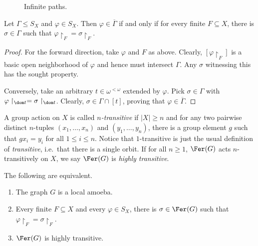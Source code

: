 \documentclass[12pt]{article}
\begin{document}
\begin{figure}[ht]
    \centering
    
    \caption{Infinite paths.}
    \label{fig:infinite_paths}
\end{figure}

\begin{lemma}
    Let $\Gamma\leq S_X$ and $\varphi\in S_X$.
    Then $\varphi\in\overline{\Gamma}$ if and only if for every finite $F\subseteq X$, there is $\sigma\in\Gamma$ such that $\varphi\restriction_F=\sigma\restriction_F$.
\end{lemma}

\begin{proof}
    For the forward direction, take $\varphi$ and $F$ as above.
    Clearly, $[\varphi\restriction_F]$ is a basic open neighborhood of $\varphi$ and hence must intersect $\Gamma$.
    Any $\sigma$ witnessing this has the sought property.
    
    Conversely, take an arbitrary $t\in\omega^{<\omega}$ extended by $\varphi$.
    Pick $\sigma\in\Gamma$ with $\varphi\restriction_{\dom t}=\sigma\restriction_{\dom t}$.
    Clearly, $\sigma\in\Gamma\cap[t]$, proving that $\varphi\in\overline{\Gamma}$.
\end{proof}

A group action on $X$ is called \emph{$n$-transitive} if $|X|\geq n$ and for any two pairwise distinct $n$-tuples $(x_1,\dots,x_n)$ and $(y_1,\dots,y_n)$, there is a group element $g$ such that $gx_i=y_i$ for all $1\leq i\leq n$.
Notice that $1$-transitive is just the usual definition of \emph{transitive}, i.e.\ that there is a single orbit.
If for all $n\geq1$, $\Fer(G)$ acts $n$-transitively on $X$, we say $\Fer(G)$ is \emph{highly transitive}.

\begin{proposition}\label{prop:char_local}
    The following are equivalent.
    \begin{enumerate}[label=(\arabic*)]
        \item The graph $G$ is a local amoeba.
        \item Every finite $F\subseteq X$ and every $\varphi\in S_X$, there is $\sigma\in\Fer(G)$ such that $\varphi\restriction_F=\sigma\restriction_F$.
        \item $\Fer(G)$ is highly transitive.
    \end{enumerate}
\end{proposition}
\end{document}
